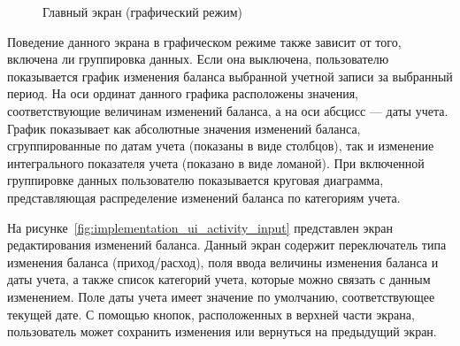 \begin{figure}[h!]
  \centering
  \caption{Главный экран (графический режим)}
  \label{fig:implementation_ui_activity_balance_graphic}
\end{figure}

Поведение данного экрана в графическом режиме также зависит от того,
включена ли группировка данных. Если она выключена,
пользователю показывается график изменения баланса выбранной
учетной записи за выбранный период.
На оси ординат данного графика расположены значения,
соответствующие величинам изменений баланса,
а на оси абсцисс --- даты учета.
График показывает как абсолютные значения изменений баланса,
сгруппированные по датам учета (показаны в виде столбцов),
так и изменение интегрального показателя учета (показано в виде ломаной).
При включенной группировке данных пользователю показывается
круговая диаграмма, представляющая распределение изменений баланса
по категориям учета.

На рисунке~\ref{fig:implementation_ui_activity_input}
представлен экран редактирования изменений баланса.
Данный экран содержит переключатель типа изменения баланса (приход/расход),
поля ввода величины изменения баланса и даты учета, а также список
категорий учета, которые можно связать с данным изменением.
Поле даты учета имеет значение по умолчанию, соответствующее текущей дате.
С помощью кнопок, расположенных в верхней части экрана, пользователь
может сохранить изменения или вернуться на предыдущий экран.

